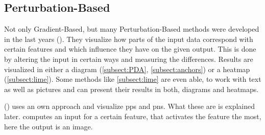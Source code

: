 \subsection{Perturbation-Based}
Not only Gradient-Based, but many Perturbation-Based methods were developed in the last years (\cite{AmitDhurandhar.2018,Ribeiro.2018,Luss.,Kim.2018,Zintgraf.2017}). They visualize how parts of the input data correspond with certain features and which influence they have on the given output. This is done by altering the input in certain ways and measuring the differences. Results are visualized in either a diagram (\cref{subsect:PDA}, \cref{subsect:anchors}) or a heatmap (\cref{subsect:lime}). Some methods like \cref{subsect:lime} are even able, to work with text as well as pictures and can present their results in both, diagrams and heatmaps. 
\par
() uses an own approach and visualize \glspl{pp} and \glspl{pn}. What these are is explained later.  computes an input for a certain feature, that activates the feature the most, here the output is an image.